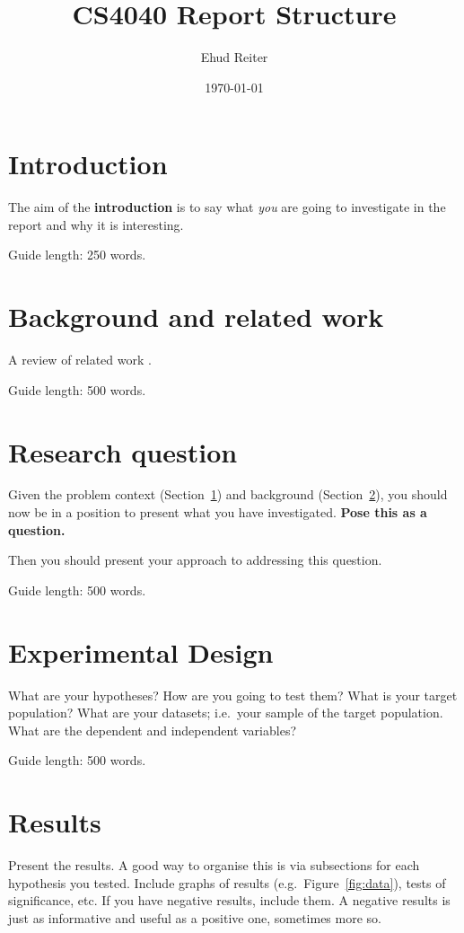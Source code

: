 \documentclass{csfourzero}
\title{CS4040 Report Structure}
\author{Ehud Reiter}
\date{\today}
\begin{document}
\maketitle


\section{Introduction}
\label{sec:intro}

The aim of the \textbf{introduction} is to say what \textit{you} are going to investigate in the report and why it
  is interesting.

Guide length: 250 words.

\section{Background and related work}
\label{sec:lit}

A review of related work \cite{p2pbookv2,macdonald2016summarising,p2pwiki}.

Guide length: 500 words.

\section{Research question}
\label{sec:rq}

Given the problem context (Section~\ref{sec:intro}) and background
(Section~\ref{sec:lit}), you should now be in a position to present
what you have investigated. \textbf{Pose this as a question.}

Then you should present your approach to addressing this
question.

Guide length: 500 words.

\section{Experimental Design}
\label{sec:exp}

What are your hypotheses? How are you going to test them? What is your
target population? What are your datasets; i.e.\ your sample of the
target population. What are the dependent and independent variables?

Guide length: 500 words.

\section{Results}
\label{sec:results}

Present the results. A good way to organise this is via subsections
for each hypothesis you tested. Include graphs of results
(e.g.\ Figure~\ref{fig:data}), tests of significance, etc. If you have
negative results, include them. A negative results is just as
informative and useful as a positive one, sometimes more so.
\end{document}
